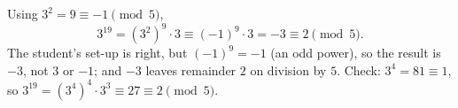Using $3^2=9\equiv-1\pmod5$,
\[3^{19}=\left(3^2\right)^9\cdot3\equiv(-1)^9\cdot3=-3\equiv\boxed{2}\pmod5 .\]
The student's set-up is right, but $(-1)^9=-1$ (an odd power), so the result is $-3$, not $3$ or $-1$; and $-3$ leaves remainder $2$ on division by $5$. Check: $3^4=81\equiv1$, so $3^{19}=\left(3^4\right)^4\cdot3^3\equiv27\equiv2\pmod5$.
